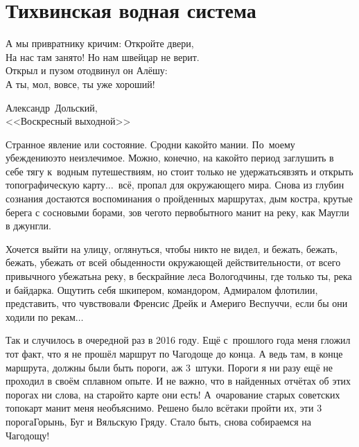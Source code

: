 \chapter{Тихвинская водная система} 

\setlength{\epigraphwidth}{0.75\textwidth}

\epigraph{%
	А мы привратнику кричим: Откройте двери,\\
	На нас там занято! Но нам швейцар не верит.\\
	Открыл и пузом отодвинул он Алёшу:\\
	\diagdash А ты, мол, вовсе, ты уже хороший!}
	{
	\begin{flushright}
		\small{Александр~Дольский,\\<<Воскресный выходной>>}
	\end{flushright}
	}

Странное явление или состояние. Сродни какой\sdash то мании. По~моему убеждению\mdash это неизлечимое. Можно, конечно, на какой\sdash то период заглушить в себе тягу к~водным путешествиям, но стоит только не удержаться\mdash взять и открыть топографическую карту$\ldots$~всё, пропал для окружающего мира. Снова из глубин сознания достаются воспоминания о пройденных маршрутах, дым костра, крутые берега с сосновыми борами, зов чего\sdash то первобытного манит на реку, как Маугли в джунгли. 

Хочется выйти на улицу, оглянуться, чтобы никто не видел, и бежать, бежать, бежать, убежать от всей обыденности окружающей действительности, от всего привычного убежать\mdash на реку, в бескрайние леса Вологодчины, где только ты, река и байдарка. Ощутить себя шкипером, командором, Адмиралом флотилии, представить, что чувствовали Френсис Дрейк и Америго Веспуччи, если бы они ходили по рекам$\ldots$ 

Так и случилось в очередной раз в 2016 году. Ещё с~прошлого года меня гложил тот факт, что я не прошёл маршрут по Чагодоще до конца. А ведь там, в конце маршрута, должны были быть пороги, аж 3~штуки. Пороги я ни разу ещё не проходил в своём сплавном опыте. И не важно, что в найденных отчётах об этих порогах ни слова, на старой\sdash то карте они есть! А~очарование старых советских топокарт манит меня необъяснимо. Решено было всё\sdash таки пройти их, эти 3 порога\mdash Горынь, Буг и Вяльскую Гряду. Стало быть, снова собираемся на Чагодощу!

